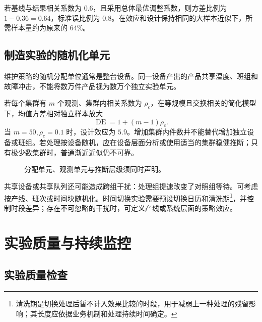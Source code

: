\begin{example}[方差缩减的数量级]
若基线与结果相关系数为 \(0.6\)，且采用总体最优调整系数，则方差比例为 \(1-0.36=0.64\)，标准误比例为 \(0.8\)。在效应和设计保持相同的大样本近似下，所需样本量约为原来的 \(64\%\)。
\end{example}

\subsection{制造实验的随机化单元}
维护策略的随机分配单位通常是整台设备。同一设备产出的产品共享温度、班组和故障冲击，不能将数万件产品视为数万个独立实验单元。

若每个集群有 \(m\) 个观测、集群内相关系数为 \(\rho_c\)，在等规模且交换相关的简化模型下，均值方差相对独立样本放大
\[
\operatorname{DE}=1+(m-1)\rho_c.
\]
当 \(m=50,\rho_c=0.1\) 时，设计效应为 \(5.9\)。增加集群内件数并不能替代增加独立设备或班组。若处理按设备随机，应在设备层面分析或使用适当的集群稳健推断；只有极少数集群时，普通渐近近似仍不可靠。

\begin{figure}[htbp]
\centering
{}
\caption{分配单元、观测单元与推断层级须同时声明。}
\end{figure}

共享设备或共享队列还可能造成跨组干扰：处理组提速改变了对照组等待。可考虑按产线、班次或时间块随机化。时间切换实验需要预设切换日历和清洗期\footnote{清洗期是切换处理后暂不计入效果比较的时段，用于减弱上一种处理的残留影响；其长度应依据业务机制和处理持续时间确定。}，并控制时段差异；存在不可忽略的干扰时，可定义产线或系统层面的策略效应。

\section{实验质量与持续监控}
\subsection{实验质量检查}

